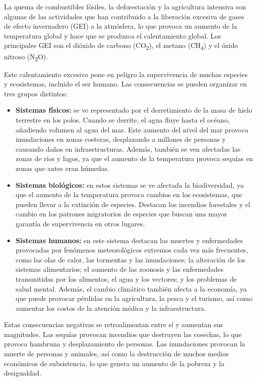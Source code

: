 \documentclass[12pt,a4paper]{report}
\begin{document}
La quema de combustibles fósiles, la deforestación y la agricultura intensiva
son algunas de las actividades que han contribuido a la liberación excesiva de
gases de efecto invernadero (GEI) a la atmósfera, lo que provoca un aumento de
la temperatura global y hace que se produzca el calentamiento global. Los
principales GEI son el dióxido de carbono (CO\textsubscript{2}), el metano
(CH\textsubscript{4}) y el óxido nitroso (N\textsubscript{2}O).

Este calentamiento excesivo pone en peligro la supervivencia de muchas especies
y ecosistemas, incluido el ser humano. Las consecuencias se pueden organizar en
tres grupos distintos:

\begin{itemize}
  \item \textbf{Sistemas físicos:} se ve representado por el derretimiento de la masa de hielo terrestre en los polos. Cuando se derrite, el agua fluye hasta el océano, añadiendo volumen al agua del mar. Este
        aumento del nivel del mar provoca inundaciones en zonas costeras, desplazando a millones de personas y causando daños en infraestructuras. Además, también se ven afectadas las zonas de ríos y lagos, ya que
        el aumento de la temperatura provoca sequías en zonas que antes eran húmedas.

  \item \textbf{Sistemas biológicos:} en estos sistemas se ve afectada la biodiversidad, ya que el aumento de la temperatura provoca cambios en los ecosistemas, que pueden llevar a la extinción de especies.
        Destacan los incendios forestales y el cambio en los patrones migratorios de especies que buscan una mayor garantía de supervivencia en otros lugares.

  \item \textbf{Sistemas humanos:} en este sistema destacan las muertes y enfermedades provocadas por fenómenos meteorológicos extremos cada vez más frecuentes, como las olas de calor, las tormentas y las
        inundaciones; la alteración de los sistemas alimentarios; el aumento de las zoonosis y las enfermedades transmitidas por los alimentos, el agua y los vectores; y los problemas de salud mental. Además, el cambio climático también afecta a la economía, ya que puede provocar pérdidas en la agricultura, la pesca y el turismo, así como aumentar los costos de la atención médica y la infraestructura.
\end{itemize}

Estas consecuencias negativas se retroalimentan entre sí y aumentan sus
magnitudes. Las sequías provocan incendios que destruyen las cosechas, lo que
provoca hambruna y desplazamiento de personas. Las inundaciones provocan la
muerte de personas y animales, así como la destrucción de muchos medios
económicos de subsistencia, lo que genera un aumento de la pobreza y la
desigualdad.
\end{document}

